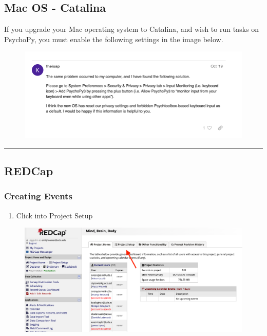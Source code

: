 \documentclass[]{book}
\providecommand{\tightlist}{%
  \setlength{\itemsep}{0pt}\setlength{\parskip}{0pt}}
\begin{document}
\hypertarget{mac-os---catalina}{%
\subsection{Mac OS - Catalina}\label{mac-os---catalina}}

If you upgrade your Mac operating system to Catalina, and wish to run tasks on PsychoPy, you must enable the following settings in the image below.

\begin{figure}
\centering
\includegraphics{images/lab_protocols/catalina/1.png}
\caption{}
\end{figure}

\begin{center}\rule{0.5\linewidth}{0.5pt}\end{center}

\hypertarget{redcap}{%
\subsection{REDCap}\label{redcap}}

\hypertarget{creating-events}{%
\subsubsection{Creating Events}\label{creating-events}}

\begin{enumerate}
\def\labelenumi{\arabic{enumi}.}
\tightlist
\item
  Click into Project Setup
\end{enumerate}

\begin{figure}
\centering
\includegraphics{images/lab_protocols/redcap/2.png}
\caption{}
\end{figure}
\end{document}
